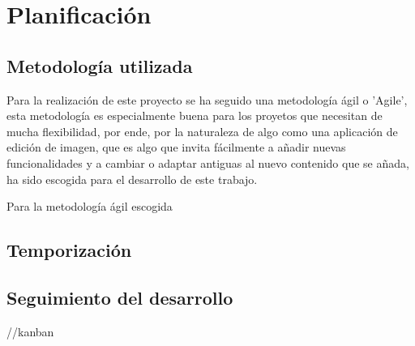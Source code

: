 \chapter{Planificación}

\section{Metodología utilizada}
    Para la realización de este proyecto se ha seguido una metodología ágil o 'Agile', esta metodología
    es especialmente buena para los proyetos que necesitan de mucha flexibilidad, por ende, por 
    la naturaleza de algo como una aplicación de edición de imagen, que es algo que invita fácilmente a añadir nuevas funcionalidades
    y a cambiar o adaptar antiguas al nuevo contenido que se añada, ha sido escogida para el desarrollo de este trabajo.

    Para la metodología ágil escogida 
\section{Temporización}
    
\section{Seguimiento del desarrollo}
    //kanban